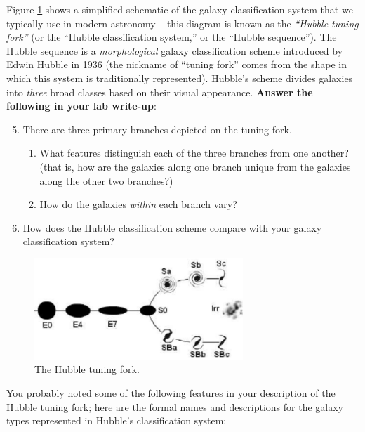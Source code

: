 \documentclass[11pt]{article}
\begin{document}
\noindent
Figure \ref{fig:Hubble} shows a simplified schematic of the galaxy classification system that we typically use in modern astronomy -- this diagram is known as the \textit{``Hubble tuning fork''} (or the ``Hubble classification system,'' or the ``Hubble sequence''). The Hubble sequence is a \emph{morphological} galaxy classification scheme introduced by Edwin Hubble in 1936 (the nickname of ``tuning fork'' comes from the shape in which this system is traditionally represented). Hubble's scheme divides galaxies into \emph{three} broad classes based on their visual appearance. \textbf{Answer the following in your lab write-up}:
\pagebreak
\begin{enumerate}
\setcounter{enumi}{4}
    \item There are three primary branches depicted on the tuning fork. 
    \begin{enumerate}
        \item What features distinguish each of the three branches from one another? (that is, how are the galaxies along one branch unique from the galaxies along the other two branches?)
        
        \item How do the galaxies \emph{within} each branch vary?
    \end{enumerate}
    
    \item How does the Hubble classification scheme compare with your galaxy classification system? 
\end{enumerate}

\begin{figure} [h!]
    \centering
    \includegraphics[width=0.7\textwidth]{Images/The-Hubble-tuning-fork.png}
    \caption{The Hubble tuning fork.}
    \label{fig:Hubble}
\end{figure}

\medskip


\noindent
You probably noted some of the following features in your description of the Hubble tuning fork; here are the formal names and descriptions for the galaxy types represented in Hubble's classification system:
\end{document}
